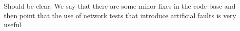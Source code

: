 Should be clear. We say that there are some minor fixes in the code-base and then point that the use of network tests that introduce artificial faults is very useful